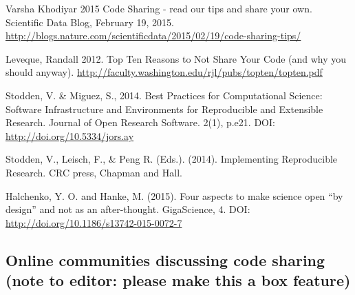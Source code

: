 \documentclass[11pt]{article}
\begin{document}
Varsha Khodiyar 2015 Code Sharing - read our tips and share your own. Scientific Data Blog, February 19, 2015. \url{http://blogs.nature.com/scientificdata/2015/02/19/code-sharing-tips/}

Leveque, Randall 2012. Top Ten Reasons to Not Share Your Code (and why you should anyway). \url{http://faculty.washington.edu/rjl/pubs/topten/topten.pdf}

Stodden, V. \& Miguez, S., 2014. Best Practices for Computational Science: Software Infrastructure and Environments for Reproducible and Extensible Research. Journal of Open Research Software. 2(1), p.e21. DOI: \url{http://doi.org/10.5334/jors.ay}

Stodden, V., Leisch, F., \& Peng R. (Eds.). (2014). Implementing Reproducible Research. CRC press, Chapman and Hall. \cite{victoria_stodden_implementing_2014}

Halchenko, Y. O. and Hanke, M. (2015). Four aspects to make science open ``by design'' and not as an after-thought. GigaScience, 4. DOI: \url{http://doi.org/10.1186/s13742-015-0072-7} \cite{Halchenko2015}

\subsection*{Online communities discussing code sharing (note to editor: please make this a box feature)}
\end{document}
